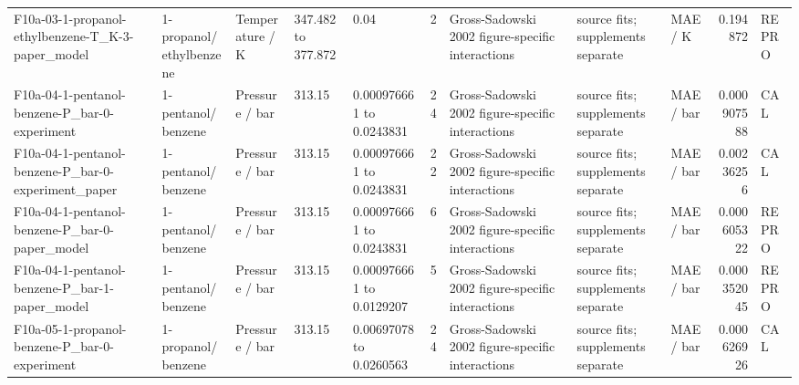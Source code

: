 \begin{landscape}
\begin{longtable}{L{1.9cm}L{2.5cm}L{2.1cm}L{1.6cm}L{1.6cm}rL{2.4cm}L{1.9cm}L{2.2cm}rL{1cm}}
F10a-\allowbreak{}03-\allowbreak{}1-\allowbreak{}propanol-\allowbreak{}ethylbenzene-\allowbreak{}T\_\allowbreak{}K-\allowbreak{}3-\allowbreak{}paper\_\allowbreak{}model & 1-\allowbreak{}propanol/\allowbreak{}ethylbenzene & Temperature /\allowbreak{} K & 347.482 to 377.872 & 0.04 & 2 & Gross-\allowbreak{}Sadowski 2002 figure-\allowbreak{}specific interactions & source fits; supplements separate & MAE /\allowbreak{} K & 0.194872 & REPRO \\
F10a-\allowbreak{}04-\allowbreak{}1-\allowbreak{}pentanol-\allowbreak{}benzene-\allowbreak{}P\_\allowbreak{}bar-\allowbreak{}0-\allowbreak{}experiment & 1-\allowbreak{}pentanol/\allowbreak{}benzene & Pressure /\allowbreak{} bar & 313.15 & 0.000976661 to 0.0243831 & 24 & Gross-\allowbreak{}Sadowski 2002 figure-\allowbreak{}specific interactions & source fits; supplements separate & MAE /\allowbreak{} bar & 0.000907588 & CAL \\
F10a-\allowbreak{}04-\allowbreak{}1-\allowbreak{}pentanol-\allowbreak{}benzene-\allowbreak{}P\_\allowbreak{}bar-\allowbreak{}0-\allowbreak{}experiment\_\allowbreak{}paper & 1-\allowbreak{}pentanol/\allowbreak{}benzene & Pressure /\allowbreak{} bar & 313.15 & 0.000976661 to 0.0243831 & 22 & Gross-\allowbreak{}Sadowski 2002 figure-\allowbreak{}specific interactions & source fits; supplements separate & MAE /\allowbreak{} bar & 0.00236256 & CAL \\
F10a-\allowbreak{}04-\allowbreak{}1-\allowbreak{}pentanol-\allowbreak{}benzene-\allowbreak{}P\_\allowbreak{}bar-\allowbreak{}0-\allowbreak{}paper\_\allowbreak{}model & 1-\allowbreak{}pentanol/\allowbreak{}benzene & Pressure /\allowbreak{} bar & 313.15 & 0.000976661 to 0.0243831 & 6 & Gross-\allowbreak{}Sadowski 2002 figure-\allowbreak{}specific interactions & source fits; supplements separate & MAE /\allowbreak{} bar & 0.000605322 & REPRO \\
F10a-\allowbreak{}04-\allowbreak{}1-\allowbreak{}pentanol-\allowbreak{}benzene-\allowbreak{}P\_\allowbreak{}bar-\allowbreak{}1-\allowbreak{}paper\_\allowbreak{}model & 1-\allowbreak{}pentanol/\allowbreak{}benzene & Pressure /\allowbreak{} bar & 313.15 & 0.000976661 to 0.0129207 & 5 & Gross-\allowbreak{}Sadowski 2002 figure-\allowbreak{}specific interactions & source fits; supplements separate & MAE /\allowbreak{} bar & 0.000352045 & REPRO \\
F10a-\allowbreak{}05-\allowbreak{}1-\allowbreak{}propanol-\allowbreak{}benzene-\allowbreak{}P\_\allowbreak{}bar-\allowbreak{}0-\allowbreak{}experiment & 1-\allowbreak{}propanol/\allowbreak{}benzene & Pressure /\allowbreak{} bar & 313.15 & 0.00697078 to 0.0260563 & 24 & Gross-\allowbreak{}Sadowski 2002 figure-\allowbreak{}specific interactions & source fits; supplements separate & MAE /\allowbreak{} bar & 0.000626926 & CAL \\

\end{longtable}
\end{landscape}
